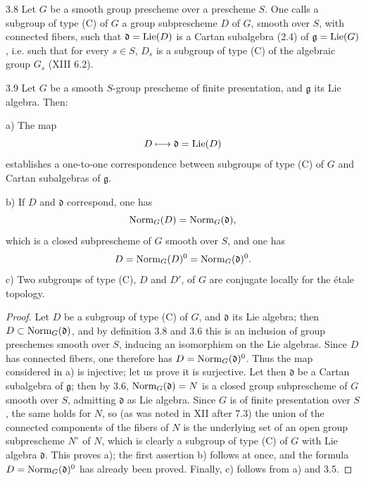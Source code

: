 \begin{definition}{3.8}\label{XIV.3.8}
Let $G$ be a smooth group prescheme over a prescheme $S$. One calls
a subgroup of type (C) of $G$ a group subprescheme $D$ of $G$, smooth
over $S$, with connected fibers, such that $\mathfrak d=\operatorname{Lie}(D)$ is
a Cartan subalgebra (2.4) of $\mathfrak g=\operatorname{Lie}(G)$, i.e. such that
for every $s\in S$, $D_s$ is a subgroup of type (C) of the algebraic
group $G_s$ (XIII 6.2).
\end{definition}

\begin{theorem}{3.9}\label{XIV.3.9}
Let $G$ be a smooth $S$-group prescheme of finite presentation,
and $\mathfrak g$ its Lie algebra. Then:

\noindent a) The map
\[
 D\longmapsto\mathfrak d=\operatorname{Lie}(D)
\]
establishes a one-to-one correspondence between subgroups of type
(C) of $G$ and Cartan subalgebras of $\mathfrak g$.

\noindent b) If $D$ and $\mathfrak d$ correspond, one has
\[
 \operatorname{Norm}_G(D)=\operatorname{Norm}_G(\mathfrak d),
\]
which is a closed subprescheme of $G$ smooth over $S$, and one has
\[
 D=\operatorname{Norm}_G(D)^0=\operatorname{Norm}_G(\mathfrak d)^0.
\]
\noindent c) Two subgroups of type (C), $D$ and $D'$, of $G$ are
conjugate locally for the \'etale topology.
\end{theorem}
\begin{proof}
Let $D$ be a subgroup of type (C) of $G$, and $\mathfrak d$ its
Lie algebra; then $D\subset\operatorname{Norm}_G(\mathfrak d)$, and by definition
3.8 and 3.6 this is an inclusion of group preschemes smooth over
$S$, inducing an isomorphism on the Lie algebras. Since $D$ has
connected fibers, one therefore has $D=\operatorname{Norm}_G(\mathfrak d)^0$.
Thus the map considered in a) is injective; let us prove it is
surjective. Let then $\mathfrak d$ be a Cartan subalgebra of
$\mathfrak g$; then by 3.6, $\operatorname{Norm}_G(\mathfrak d)=N$ is a closed
group subprescheme of $G$ smooth over $S$, admitting $\mathfrak d$
as Lie algebra. Since $G$ is of finite presentation over $S$,
the same holds for $N$, so (as was noted in XII after 7.3) the
union of the connected components of the fibers of $N$ is the
underlying set of an open group subprescheme $N^\circ$ of $N$,
which is clearly a subgroup of type (C) of $G$ with Lie algebra
$\mathfrak d$. This proves a); the first assertion b) follows
at once, and the formula $D=\operatorname{Norm}_G(\mathfrak d)^0$ has already
been proved. Finally, c) follows from a) and 3.5.
\end{proof}

